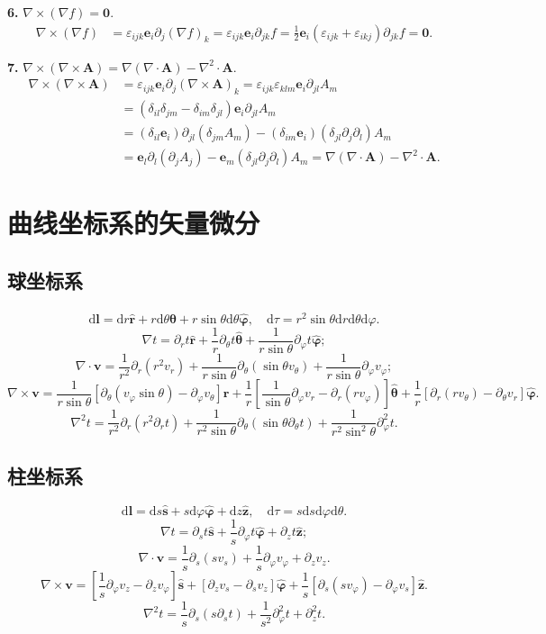 \documentclass{article}
\newcommand\del{\partial}
\newcommand\bo[1]{\boldsymbol{#1}}
\renewcommand\d{\mathrm{d}}
\newcommand\bh[1]{\boldsymbol{\hat{#1}}}
\begin{document}
\textbf{6. }$\nabla\times(\nabla f)=\bo{0}$.
\begin{align*}
\nabla\times(\nabla f)&=\varepsilon_{ijk}\bo{e}_i\del_j(\nabla f)_k=\varepsilon_{ijk}\bo{e}_i\del_{jk}f=\frac12\bo{e}_i(\varepsilon_{ijk}+\varepsilon_{ikj})\del_{jk}f=\bo{0}.
\end{align*}

\textbf{7. }$\nabla\times(\nabla\times\bo{A})=\nabla(\nabla\cdot\bo{A})-\nabla^2\cdot\bo{A}$.
\begin{align*}
\nabla\times(\nabla\times\bo{A})&=\varepsilon_{ijk}\bo{e}_i\del_j(\nabla\times\bo{A})_k=\varepsilon_{ijk}\varepsilon_{klm}\bo{e}_i\del_{jl}A_m\\
&=(\delta_{il}\delta_{jm}-\delta_{im}\delta_{jl})\bo{e}_i\del_{jl}A_m\\
&=(\delta_{il}\bo{e}_i)\del_{jl}(\delta_{jm}A_m)-(\delta_{im}\bo{e}_i)(\delta_{jl}\del_j\del_l)A_m\\
&=\bo{e}_l\del_{l}(\del_j A_j)-\bo e_m(\delta_{jl}\del_j\del_l)A_m=\nabla(\nabla\cdot\bo{A})-\nabla^2\cdot\bo{A}.
\end{align*}

\section{曲线坐标系的矢量微分}
\subsection{球坐标系}
\[\d\bo l=\d r\bh r+r\d\theta\bh\theta+r\sin\theta\d\theta\bh\varphi,\quad \d\tau=r^2\sin\theta\d r\d\theta\d\varphi.\]
\[\nabla t=\del_rt\bh{r}+\frac{1}{r}\del_\theta t\bh{\theta}+\frac{1}{r\sin\theta}\del_\varphi t\bh{\varphi};\]
\[\nabla\cdot\bo v=\frac{1}{r^2}\del_r(r^2v_r)+\frac{1}{r\sin\theta}\del_\theta(\sin\theta v_\theta)+\frac{1}{r\sin\theta}\del_\varphi v_\varphi;\]
\[\nabla\times\bo v=\frac{1}{r\sin\theta}\left[\del_\theta(v_\varphi\sin\theta)-\del_\varphi v_\theta\right]\bh r+\frac{1}{r}\left[\frac{1}{\sin\theta}\del_\varphi v_r-\del_r(rv_\varphi)\right]\bh\theta+\frac{1}{r}\left[\del_r(rv_\theta)-\del_\theta v_r\right]\bh\varphi.\]
\[\nabla^{2}t=\frac{1}{r^2}\del_r(r^2\del_rt)+\frac{1}{r^2\sin\theta}\del_\theta(\sin\theta\del_\theta t)+\frac{1}{r^2\sin^2\theta}\del_{\varphi}^2t.\]

\subsection{柱坐标系}
\[\d\bo l=\d s\bh s+s\d\varphi\bh\varphi+\d z\bh z,\quad\d\tau=s\d s\d\varphi\d\theta.\]
\[\nabla t=\del_s t\bh s+\frac{1}{s}\del_\varphi t\bh\varphi+\del_z t\bh z;\]
\[\nabla\cdot\bo v=\frac{1}{s}\del_s(sv_s)+\frac{1}{s}\del_\varphi v_\varphi+\del_z v_z.\]
\[\nabla\times\bo v=\left[\frac{1}{s}\del_\varphi v_z-\del_zv_\varphi\right]\bh s+\left[\del_zv_s-\del_sv_z\right]\bh\varphi+\frac{1}{s}\left[\del_s(sv_\varphi)-\del_\varphi v_s\right]\bh z.\]
\[\nabla^2t=\frac{1}{s}\del_s(s\del_st)+\frac{1}{s^2}\del_\varphi^2t+\del_z^2t.\]
\end{document}
